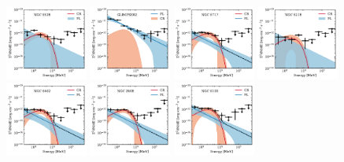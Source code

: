 \documentclass[doublespace,draft,nopageskip]{VTthesis} %
\begin{document}
\begin{appendices}
\begin{figure}
\includegraphics[width=0.24\textwidth]{Figures/Globular/spectra/2comp_20.pdf}
\includegraphics[width=0.24\textwidth]{Figures/Globular/spectra/2comp_2.pdf}
\includegraphics[width=0.24\textwidth]{Figures/Globular/spectra/2comp_23.pdf}
\includegraphics[width=0.24\textwidth]{Figures/Globular/spectra/2comp_10.pdf}
\includegraphics[width=0.24\textwidth]{Figures/Globular/spectra/2comp_17.pdf}
\includegraphics[width=0.24\textwidth]{Figures/Globular/spectra/2comp_5.pdf}
\includegraphics[width=0.24\textwidth]{Figures/Globular/spectra/2comp_9.pdf}

\end{figure}
\end{appendices}
\end{document}
